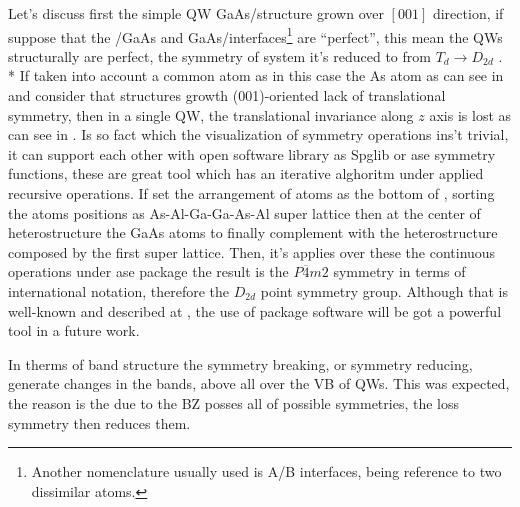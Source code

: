 Let's discuss first the simple QW GaAs/\algaas structure grown over $\left[001\right]$ direction, if suppose that the \algaas/GaAs and GaAs/\algaas interfaces\footnote{Another nomenclature usually used is A/B interfaces, being reference to two dissimilar atoms.} are ``perfect'', this mean the QWs structurally are perfect,  the symmetry of system it's reduced to from $T_{d}\to D_{2d}$ \cite{magri2000anticrossing,ivchenko1996heavylight}.  \\*
If taken into account a common atom as in this case the As atom as can see in 
 and consider that structures growth (001)-oriented lack of translational symmetry\cite{ivchenko1996heavylight}, then in a single QW, the translational invariance along $z$ axis is lost\cite{tronc2000bound} as can see in . Is so fact which the visualization of symmetry operations ins't trivial, it can support each other with  open software library as \gls{Spglib} or \gls{ase}  symmetry functions, these are great tool which has an iterative alghoritm under applied recursive operations. If set the arrangement of atoms as the bottom of , sorting the atoms positions as As-Al-Ga-Ga-As-Al super lattice then at the center of heterostructure the GaAs atoms to finally complement with the heterostructure composed by the first super lattice. Then, it's applies over these the continuous operations under \gls{ase} package the result is the $P\overline{4}m2$ symmetry in terms of international notation, therefore the $D_{2d}$ point symmetry group. 
Although that is well-known and described at \cite{tronc2000bound,ivchenko1996heavylight,glazov2018electron,krebs1996giant,magri2000anticrossing,chen2002interface,ivchenko2008spinphoto}, the use of package software will be got a powerful tool in a future work. 

In therms of band structure the symmetry breaking, or symmetry reducing, generate changes in the bands, above all over the VB of QWs. This was expected, the reason is the due to the \gls{BZ} posses all of possible symmetries, the loss symmetry then reduces them. 
















\newpage
